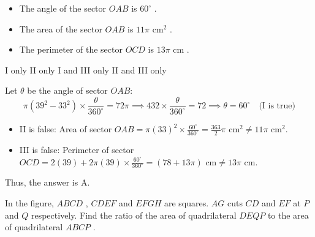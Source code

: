 \begin{minipage}{0.48\textwidth}
\begin{itemize}
    \item[I.] The angle of the sector $OAB$ is $60^\circ$ .
    \item[II.] The area of the sector $OAB$ is $11\pi\text{ cm}^2$ .
    \item[III.] The perimeter of the sector $OCD$ is $13\pi\text{ cm}$ .
\end{itemize}
\begin{choices}
    \correctchoice I only
    \choice II only
    \choice I and III only
    \choice II and III only
\end{choices}
\end{minipage}
\begin{minipage}{0.48\textwidth}
\centering
{}
\end{minipage}
\begin{solution}
Let $\theta$ be the angle of sector $OAB$:
\[ \pi(39^2 - 33^2) \times \frac{\theta}{360^\circ} = 72\pi \implies 432 \times \frac{\theta}{360^\circ} = 72 \implies \theta = 60^\circ \quad \text{(I is true)} \]
\begin{itemize}
    \item II is false: Area of sector $OAB = \pi(33)^2 \times \frac{60^\circ}{360^\circ} = \frac{363}{2}\pi\text{ cm}^2 \ne 11\pi\text{ cm}^2$.
    \item III is false: Perimeter of sector $OCD = 2(39) + 2\pi(39)\times\frac{60^\circ}{360^\circ} = (78 + 13\pi)\text{ cm} \ne 13\pi\text{ cm}$.
\end{itemize}
Thus, the answer is A.
\end{solution}

\question In the figure, $ABCD$ , $CDEF$ and $EFGH$ are squares. $AG$ cuts $CD$ and $EF$ at $P$ and $Q$ respectively. Find the ratio of the area of quadrilateral $DEQP$ to the area of quadrilateral $ABCP$ .

